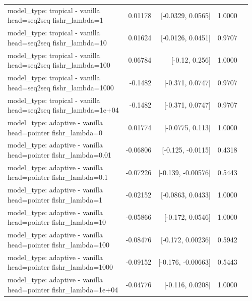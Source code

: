 \documentclass[10pt]{article}
\makeatletter
\newcommand{\stackcell}[1]{\begin{tabular}[t]{@{}l@{}}#1\end{tabular}}
\makeatother
\begin{document}
{\begin{longtable}{lrrrl}
\stackcell{model\_type: tropical - vanilla\\\footnotesize head=seq2seq fishr\_lambda=1 } & 0.01178 & [-0.0329, 0.0565] & 1.0000 & \\
\stackcell{model\_type: tropical - vanilla\\\footnotesize head=seq2seq fishr\_lambda=10 } & 0.01624 & [-0.0126, 0.0451] & 0.9707 & \\
\stackcell{model\_type: tropical - vanilla\\\footnotesize head=seq2seq fishr\_lambda=100 } & 0.06784 & [-0.12, 0.256] & 1.0000 & \\
\stackcell{model\_type: tropical - vanilla\\\footnotesize head=seq2seq fishr\_lambda=1000 } & -0.1482 & [-0.371, 0.0747] & 0.9707 & \\
\stackcell{model\_type: tropical - vanilla\\\footnotesize head=seq2seq fishr\_lambda=1e+04 } & -0.1482 & [-0.371, 0.0747] & 0.9707 & \\
\stackcell{model\_type: adaptive - vanilla\\\footnotesize head=pointer fishr\_lambda=0 } & 0.01774 & [-0.0775, 0.113] & 1.0000 & \\
\stackcell{model\_type: adaptive - vanilla\\\footnotesize head=pointer fishr\_lambda=0.01 } & -0.06806 & [-0.125, -0.0115] & 0.4318 & \\
\stackcell{model\_type: adaptive - vanilla\\\footnotesize head=pointer fishr\_lambda=0.1 } & -0.07226 & [-0.139, -0.00576] & 0.5443 & \\
\stackcell{model\_type: adaptive - vanilla\\\footnotesize head=pointer fishr\_lambda=1 } & -0.02152 & [-0.0863, 0.0433] & 1.0000 & \\
\stackcell{model\_type: adaptive - vanilla\\\footnotesize head=pointer fishr\_lambda=10 } & -0.05866 & [-0.172, 0.0546] & 1.0000 & \\
\stackcell{model\_type: adaptive - vanilla\\\footnotesize head=pointer fishr\_lambda=100 } & -0.08476 & [-0.172, 0.00236] & 0.5942 & \\
\stackcell{model\_type: adaptive - vanilla\\\footnotesize head=pointer fishr\_lambda=1000 } & -0.09152 & [-0.176, -0.00663] & 0.5443 & \\
\stackcell{model\_type: adaptive - vanilla\\\footnotesize head=pointer fishr\_lambda=1e+04 } & -0.04776 & [-0.116, 0.0208] & 1.0000 & \\

\end{longtable}}
\end{document}
